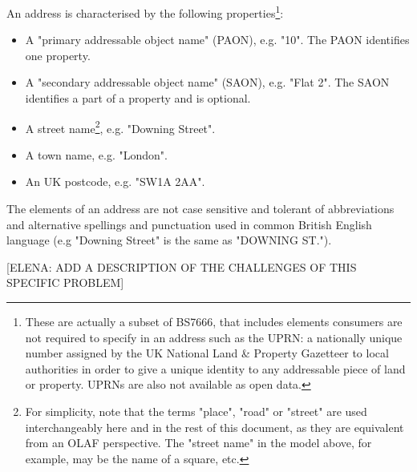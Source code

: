 An address is characterised by the following properties\footnote{These are actually a subset of BS7666, that includes elements consumers are not required to specify in an address such as the UPRN: a nationally unique number assigned by the UK National Land \& Property Gazetteer to local authorities in order to give a unique identity to any addressable piece of land or property. UPRNs are also not available as open data.}:

\begin{itemize}
    \item A "primary addressable object name" (PAON), e.g. "10". The PAON identifies one property.
    \item A "secondary addressable object name" (SAON), e.g. "Flat 2". The SAON identifies a part of a property and is optional.
    \item A street name\footnote{For simplicity, note that the terms "place", "road" or "street" are used interchangeably here and in the rest of this document, as they are equivalent from an OLAF perspective. The "street name" in the model above, for example, may be the name of a square, etc.}, e.g. "Downing Street".
    \item A town name, e.g. "London".
    \item An UK postcode, e.g. "SW1A 2AA".
\end{itemize}

The elements of an address are not case sensitive and tolerant of abbreviations and alternative spellings and punctuation used in common British English language (e.g "Downing Street" is the same as "DOWNING ST.").

[ELENA: ADD A DESCRIPTION OF THE CHALLENGES OF THIS SPECIFIC PROBLEM]


